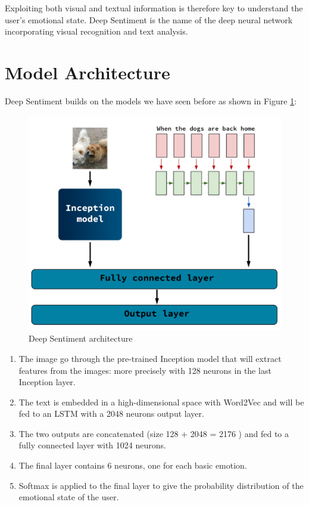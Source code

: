 Exploiting both visual and textual information is therefore key to understand the user's emotional state. Deep Sentiment is the name of the deep neural network incorporating visual recognition and text analysis.

\section{Model Architecture}

Deep Sentiment builds on the models we have seen before as shown in Figure \ref{deep-sentiment}:

\begin{figure}[H]
    \centering
    \includegraphics[width=\textwidth]{Images/deep-sentiment.png}
    \caption{Deep Sentiment architecture}
    \label{deep-sentiment}
\end{figure}

\begin{enumerate}
    \item The image go through the pre-trained Inception model that will extract features from the images: more precisely with 128 neurons in the last Inception 
    layer.
    \item The text is embedded in a high-dimensional space with Word2Vec and will be fed to an LSTM with a 2048 neurons output layer.
    \item The two outputs are concatenated (size 128 + 2048 = 2176 ) and fed to a fully connected layer with 1024 neurons. 
    \item The final layer contains 6 neurons, one for each basic emotion.
    \item Softmax is applied to the final layer to give the probability distribution of the emotional state of the user.
\end{enumerate}

